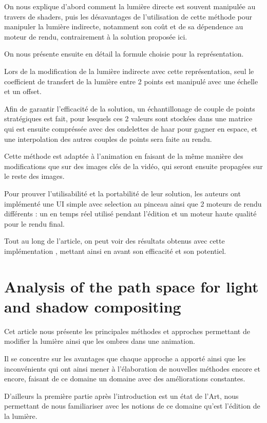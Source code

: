 \documentclass[runningheads]{llncs}
\begin{document}
On nous explique d'abord comment la lumière directe est souvent manipulée au travers de shaders, puis les désavantages de l'utilisation de cette méthode pour manipuler la lumière indirecte, notamment son coût et de sa dépendence au moteur de rendu, contrairement à la solution proposée ici.

On nous présente ensuite en détail la formule choisie pour la représentation. 

Lors de la modification de la lumière indirecte avec cette représentation, seul le coefficient de transfert de la lumière entre 2 points est manipulé avec une échelle et un offset.  

Afin de garantir l'efficacité de la solution, un échantillonage de couple de points stratégiques est fait, pour lesquels ces 2 valeurs sont stockées dans une matrice qui est ensuite compréssée avec des ondelettes de haar pour gagner en espace, et une interpolation des autres couples de points sera faite au rendu.

Cette méthode est adaptée à l'animation en faisant de la même manière des modifications que sur des images clés de la vidéo, qui seront ensuite propagées sur le reste des images.

Pour prouver l'utilisabilité et la portabilité de leur solution, les auteurs ont implémenté une UI simple avec selection au pinceau ainsi que 2 moteurs de rendu différents : un en temps réel utilisé pendant l'édition et un moteur haute qualité pour le rendu final.

Tout au long de l'article, on peut voir des résultats obtenus avec cette implémentation , mettant ainsi en avant son efficacité et son potentiel.

\newpage
\section{Analysis of the path space for light and shadow compositing}
Cet article nous présente les principales méthodes et approches permettant de modifier la lumière ainsi que les ombres dans une animation.

Il se concentre sur les avantages que chaque approche a apporté ainsi que les inconvénients qui ont ainsi mener à l’élaboration de nouvelles méthodes encore et encore, faisant de ce domaine un domaine avec des améliorations constantes.

D’ailleurs la première partie après l’introduction est un état de l’Art, nous permettant de nous familiariser avec les notions de ce domaine qu’est l’édition de la lumière.
\end{document}
